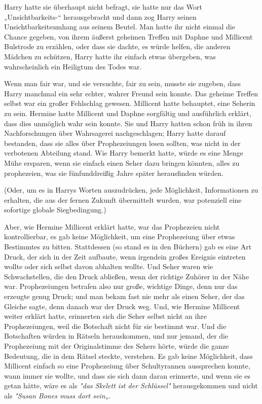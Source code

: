 {Harry hatte sie überhaupt nicht befragt, sie hatte nur das Wort „Unsichtbarkeits-“ herausgebracht und dann zog Harry seinen Unsichtbarkeitsumhang aus seinem Beutel. Man hatte ihr nicht einmal die Chance gegeben, von ihrem äußerst geheimen Treffen mit Daphne und Millicent Bulstrode zu erzählen, oder dass sie dachte, es würde helfen, die anderen Mädchen zu schützen, Harry hatte ihr einfach etwas übergeben, was wahrscheinlich ein Heiligtum des Todes war.

Wenn man fair war, und sie versuchte, fair zu sein, musste sie zugeben, dass Harry manchmal ein sehr echter, wahrer Freund sein konnte. Das geheime Treffen selbst war ein großer Fehlschlag gewesen. Millicent hatte behauptet, eine Seherin zu sein. Hermine hatte Millicent und Daphne sorgfältig und ausführlich erklärt, dass dies unmöglich wahr sein konnte. Sie und Harry hatten schon früh in ihren Nachforschungen über Wahrsagerei nachgeschlagen; Harry hatte darauf bestanden, dass sie alles über Prophezeiungen lesen sollten, was nicht in der verbotenen Abteilung stand. Wie Harry bemerkt hatte, würde es eine Menge Mühe ersparen, wenn sie einfach einen Seher dazu bringen könnten, alles zu prophezeien, was sie fünfunddreißig Jahre später herausfinden würden.

(Oder, um es in Harrys Worten auszudrücken, jede Möglichkeit, Informationen zu erhalten, die aus der fernen Zukunft übermittelt wurden, war potenziell eine sofortige globale Siegbedingung.)

Aber, wie Hermine Millicent erklärt hatte, war das Prophezeien nicht kontrollierbar, es gab keine Möglichkeit, um eine Prophezeiung über etwas Bestimmtes zu bitten. Stattdessen (so stand es in den Büchern) gab es eine Art Druck, der sich in der Zeit aufbaute, wenn irgendein großes Ereignis eintreten wollte oder sich selbst davon abhalten wollte. Und Seher waren wie Schwachstellen, die den Druck abließen, wenn der richtige Zuhörer in der Nähe war. Prophezeiungen betrafen also nur große, wichtige Dinge, denn nur das erzeugte genug Druck; und man bekam fast nie mehr als einen Seher, der das Gleiche sagte, denn danach war der Druck weg. Und, wie Hermine Millicent weiter erklärt hatte, erinnerten sich die Seher selbst nicht an ihre Prophezeiungen, weil die Botschaft nicht für sie bestimmt war. Und die Botschaften würden in Rätseln herauskommen, und nur jemand, der die Prophezeiung mit der Originalstimme des Sehers hörte, würde die ganze Bedeutung, die in dem Rätsel steckte, verstehen. Es gab keine Möglichkeit, dass Millicent einfach so eine Prophezeiung über Schultyrannen aussprechen konnte, wann immer sie wollte, und dass sie sich dann daran erinnerte, und wenn sie es getan hätte, wäre es als \emph{"das Skelett ist der Schlüssel"} herausgekommen und nicht als \emph{"Susan Bones muss dort sein„}.

}
